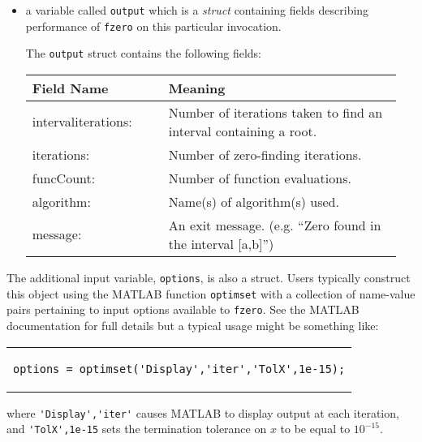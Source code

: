 \begin{itemize}
\item a variable called \lstinline[style=myMatlab]{output} which is a \emph{struct} containing fields describing performance of \lstinline[style=myMatlab]{fzero} on this particular invocation.


The  \lstinline[style=myMatlab]{output} struct contains the following fields:
\begin{center}
\begin{tabular}{|p{0.35\linewidth} | p{0.6\linewidth}|}
\hline
\textbf{Field Name} & \textbf{Meaning} \\ \hline
intervaliterations: & Number of iterations taken to find an interval containing a root. \\
iterations: & Number of zero-finding iterations. \\
funcCount: & Number of function evaluations. \\ 
algorithm: & Name(s) of algorithm(s) used. \\
message: & An exit message. (e.g. ``Zero found in the interval [a,b]'')\\
\hline
\end{tabular}
\end{center}


\end{itemize} 

The additional input variable, \lstinline[style=myMatlab]{options}, is also a struct. Users typically construct this object using the MATLAB function \lstinline[style=myMatlab]{optimset} with a collection of name-value pairs pertaining to input options available to \lstinline[style=myMatlab]{fzero}.  See the MATLAB documentation for full details but a typical usage might be something like:

\begin{center}
\begin{tabular}{c}
\begin{lstlisting}[style=myMatlab, frame=none, numbers=none, basicstyle=\small]
options = optimset('Display','iter','TolX',1e-15);
\end{lstlisting}
\end{tabular}
\end{center}
where \lstinline[style=myMatlab]{'Display','iter'} causes MATLAB to display output at each iteration, and \lstinline[style=myMatlab]{'TolX',1e-15} sets the termination tolerance on $x$ to be equal to $10^{-15}$.


  


